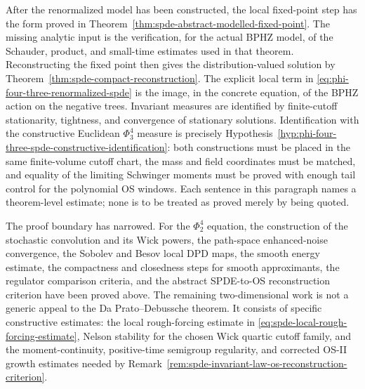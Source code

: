 After the renormalized model has been constructed, the local fixed-point
step has the form proved in
Theorem~\ref{thm:spde-abstract-modelled-fixed-point}.  The missing analytic
input is the verification, for the actual BPHZ model, of the Schauder,
product, and small-time estimates used in that theorem.  Reconstructing the
fixed point then gives the distribution-valued solution by
Theorem~\ref{thm:spde-compact-reconstruction}.  The explicit local term in
\eqref{eq:phi-four-three-renormalized-spde} is the image, in the concrete
equation, of the BPHZ action on the negative trees.  Invariant measures are
identified by finite-cutoff stationarity, tightness, and convergence of
stationary solutions.  Identification with the constructive Euclidean
\(\Phi^4_3\) measure is precisely
Hypothesis~\ref{hyp:phi-four-three-spde-constructive-identification}: both
constructions must be placed in the same finite-volume cutoff chart, the mass
and field coordinates must be matched, and equality of the limiting Schwinger
moments must be proved with enough tail control for the polynomial OS windows.
Each sentence in this paragraph names a theorem-level estimate; none is to be
treated as proved merely by being quoted.

The proof boundary has narrowed.
For the \(\Phi^4_2\) equation, the construction of the stochastic
convolution and its Wick powers, the path-space enhanced-noise convergence,
the Sobolev and Besov local DPD maps, the smooth energy estimate, the
compactness and closedness steps for smooth approximants, the regulator
comparison criteria, and the abstract SPDE-to-OS reconstruction criterion
have been proved above.  The remaining two-dimensional work is not a generic
appeal to the Da Prato--Debussche theorem.  It consists of specific
constructive estimates: the local rough-forcing estimate in
\eqref{eq:spde-local-rough-forcing-estimate}, Nelson stability for the
chosen Wick quartic cutoff family, and the moment-continuity, positive-time
semigroup regularity, and corrected OS-II growth estimates needed by
Remark~\ref{rem:spde-invariant-law-os-reconstruction-criterion}.

